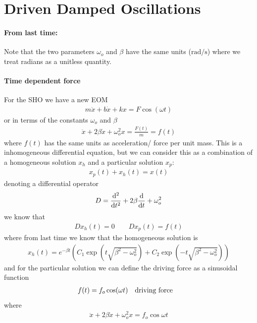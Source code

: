 \documentclass[../main.tex]{subfiles}
\begin{document}
\section*{Driven Damped Oscillations}
\paragraph*{From last time:} Note that the two parameters $\omega_o$ and $\beta$ have the same units
($\unit{\radian/\s}$) where we treat radians as a unitless quantity. 

\paragraph*{Time dependent force} For the SHO we have a new EOM
\begin{align*}
    m \ddot x + b \dot x + kx = F \cos(\omega t)
\end{align*}
or in terms of the constants $\omega_o$ and $\beta$
\begin{align*}
    \ddot x + 2 \beta \dot x + \omega_o^2 x = \frac{F(t)}{m} = f(t) 
\end{align*}
where $f(t)$ has the same units as acceleration/ force per unit mass. This is a inhomogeneous
differential equation, but we can consider this as a combination of a homogeneous solution $x_h$ and
a particular solution $x_p$:
\begin{align*}
    x_p(t) + x_h(t) = x(t)
\end{align*}
denoting a differential operator
\begin{align*}
    D = \dv[2]{t} + 2 \beta \dv{t} + \omega_o^2
\end{align*}
we know that
\begin{align*}
    D x_h(t) = 0 \qquad D x_p(t) = f(t)
\end{align*}
where from last time we know that the homogeneous solution is
\begin{align*}
    x_h(t) = e^{-\beta t} (C_1 \exp(t\sqrt{\beta^2 - \omega_o^2})
        + C_2 \exp(-t\sqrt{\beta^2 - \omega_o^2}))
\end{align*}
and for the particular solution we can define the driving force as a sinusoidal function
\begin{align*}
    f(t) = f_o \cos(\omega t) \qqtext{driving force}
\end{align*}
where
\begin{align*}
    \ddot x + 2\beta \dot x + \omega_o^2 x = f_o \cos \omega t
\end{align*}
\end{document}
